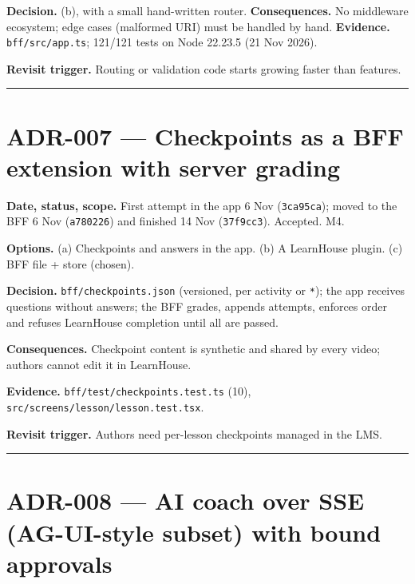 \documentclass[
  11pt,
]{article}
\begin{document}
\textbf{Decision.} (b), with a small hand-written router.
\textbf{Consequences.} No middleware ecosystem; edge cases (malformed
URI) must be handled by hand. \textbf{Evidence.}
\texttt{bff/src/app.ts}; 121/121 tests on Node 22.23.5 (21 Nov 2026).

\textbf{Revisit trigger.} Routing or validation code starts growing
faster than features.

\begin{center}\rule{0.5\linewidth}{0.5pt}\end{center}

\hypertarget{adr-007-checkpoints-as-a-bff-extension-with-server-grading}{%
\section{ADR-007 --- Checkpoints as a BFF extension with server
grading}\label{adr-007-checkpoints-as-a-bff-extension-with-server-grading}}

\textbf{Date, status, scope.} First attempt in the app 6 Nov
(\texttt{3ca95ca}); moved to the BFF 6 Nov (\texttt{a780226}) and
finished 14 Nov (\texttt{37f9cc3}). Accepted. M4.

\textbf{Options.} (a) Checkpoints and answers in the app. (b) A
LearnHouse plugin. (c) BFF file + store (chosen).

\textbf{Decision.} \texttt{bff/checkpoints.json} (versioned, per
activity or \texttt{*}); the app receives questions without answers; the
BFF grades, appends attempts, enforces order and refuses LearnHouse
completion until all are passed.

\textbf{Consequences.} Checkpoint content is synthetic and shared by
every video; authors cannot edit it in LearnHouse.

\textbf{Evidence.} \texttt{bff/test/checkpoints.test.ts} (10),
\texttt{src/screens/lesson/lesson.test.tsx}.

\textbf{Revisit trigger.} Authors need per-lesson checkpoints managed in
the LMS.

\begin{center}\rule{0.5\linewidth}{0.5pt}\end{center}

\hypertarget{adr-008-ai-coach-over-sse-ag-ui-style-subset-with-bound-approvals}{%
\section{ADR-008 --- AI coach over SSE (AG-UI-style subset) with bound
approvals}\label{adr-008-ai-coach-over-sse-ag-ui-style-subset-with-bound-approvals}}
\end{document}
